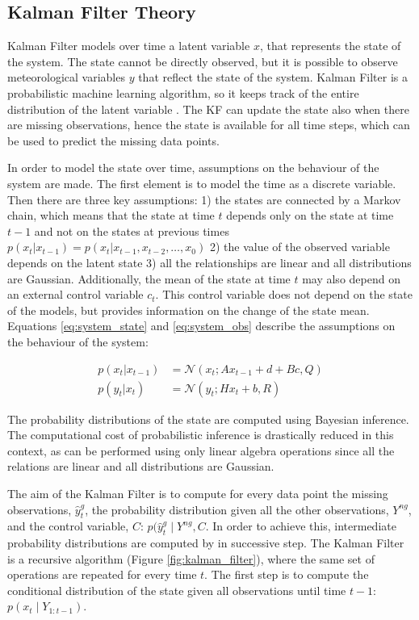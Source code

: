 \documentclass{article}
\newcommand{\norm}[3]{\mathcal{N}\left(#1; #2, #3\right)} %
\let\Oldsubsection\subsection
\renewcommand{\subsection}{\FloatBarrier\Oldsubsection}
\begin{document}
\subsection{Kalman Filter Theory}

Kalman Filter models over time a latent variable $x$, that represents the state of the system. The state cannot be directly observed, but it is possible to observe meteorological variables $y$ that reflect the state of the system. 
Kalman Filter is a probabilistic machine learning algorithm, so it keeps track of the entire distribution of the latent variable \cite{bishop_pattern_2006}.
The KF can update the state also when there are missing observations, hence the state is available for all time steps, which can be used to predict the missing data points.

In order to model the state over time, assumptions on the behaviour of the system are made. The first element is to model the time as a discrete variable.  Then there are three key assumptions: 1) the states are connected by a Markov chain, which means that the state at time $t$ depends only on the state at time $t-1$ and not on the states at previous times $p(x_t|x_{t-1}) = p(x_t|x_{t-1}, x_{t-2}, \hdots, x_0)$ 2) the value of the observed variable depends on the latent state 3) all the relationships are linear and all distributions are Gaussian. Additionally, the mean of the state at time $t$ may also depend on an external control variable $c_t$. This control variable does not depend on the state of the models, but provides information on the change of the state mean.
Equations \ref{eq:system_state} and \ref{eq:system_obs} describe the assumptions on the behaviour of the system:

\begin{align}
p(x_t | x_{t-1}) &= \norm{x_t}{Ax_{t-1} + d + Bc}{Q} \label{eq:system_state}\\
p(y_t | x_t) &= \norm{y_t}{Hx_t + b}{R} \label{eq:system_obs}
\end{align}

The probability distributions of the state are computed using Bayesian inference. The computational cost of probabilistic inference is drastically reduced in this context, as can be performed using only linear algebra operations since all the relations are linear and all distributions are Gaussian.

The aim of the Kalman Filter is to compute for every data point the missing observations, $\hat{y}^g_t$, the probability distribution given all the other observations, $Y^{ng}$, and the control variable, $C$: $p(\hat{y}^g_t \mid Y^{ng}, C$. In order to achieve this, intermediate probability distributions are computed by in successive step. 
The Kalman Filter is a recursive algorithm (Figure \ref{fig:kalman_filter}), where the same set of operations are repeated for every time $t$. The first step is to compute the conditional distribution of the state given all observations until time $t-1$: $p(x_t \mid Y_{1:t-1})$.
\end{document}

